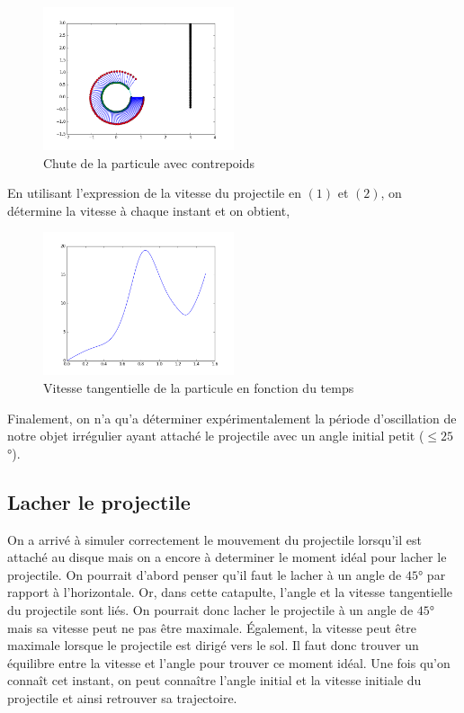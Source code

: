 \documentclass[10pt]{article}
\begin{document}
\begin{figure}[h]
\centering
 \includegraphics[width=0.5\textwidth]{../fig/fig3.png}
\caption{Chute de la particule avec contrepoids}
\end{figure}
En utilisant l'expression de la vitesse du projectile en $(1)$ et $(2)$, on détermine la vitesse à chaque instant et on obtient,

\begin{figure}[h!]
\centering
  \includegraphics[width=0.5\textwidth]{../fig/fig4.png}
  \caption{Vitesse tangentielle de la particule en fonction du temps}
\end{figure}

\pagebreak


Finalement, on n'a qu'a déterminer expérimentalement la période d'oscillation de notre objet irrégulier ayant attaché le projectile avec un angle
initial petit ($\leq 25$°).
\subsection{Lacher le projectile}

On a arrivé à simuler correctement le mouvement du projectile lorsqu'il est attaché au disque mais on a encore à determiner
le moment idéal pour lacher le projectile. On pourrait d'abord penser qu'il faut le lacher à un angle de $45$° par rapport à
l'horizontale. Or, dans cette catapulte, l'angle et la vitesse tangentielle du projectile sont liés.
On pourrait donc lacher le projectile à un angle de $45$° mais sa vitesse peut ne pas être maximale. Également, la vitesse
peut être maximale lorsque le projectile est dirigé vers le sol. Il faut donc trouver un équilibre entre la vitesse et l'angle
pour trouver ce moment idéal. Une fois qu'on connaît cet instant, on peut connaître l'angle initial et la vitesse initiale
du projectile et ainsi retrouver sa trajectoire. 
\end{document}
